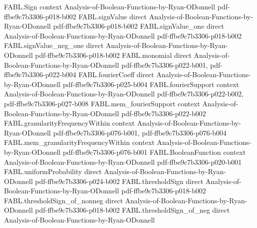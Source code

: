 \begin{theorem}
\label{FABL.booleanInfluence_eq_dimensionEdgeBoundaryFraction}
\leanok
{}
\proofstep
  {FABL.Sign}
  {context}
  {Analysis-of-Boolean-Functions-by-Ryan-ODonnell}
  {pdf-ffbe9c7b3306-p018-b002}
\proofstep
  {FABL.signValue}
  {direct}
  {Analysis-of-Boolean-Functions-by-Ryan-ODonnell}
  {pdf-ffbe9c7b3306-p018-b002}
\proofstep
  {FABL.signValue_one}
  {direct}
  {Analysis-of-Boolean-Functions-by-Ryan-ODonnell}
  {pdf-ffbe9c7b3306-p018-b002}
\proofstep
  {FABL.signValue_neg_one}
  {direct}
  {Analysis-of-Boolean-Functions-by-Ryan-ODonnell}
  {pdf-ffbe9c7b3306-p018-b002}
\proofstep
  {FABL.monomial}
  {direct}
  {Analysis-of-Boolean-Functions-by-Ryan-ODonnell}
  {pdf-ffbe9c7b3306-p022-b001,
    pdf-ffbe9c7b3306-p022-b004}
\proofstep
  {FABL.fourierCoeff}
  {direct}
  {Analysis-of-Boolean-Functions-by-Ryan-ODonnell}
  {pdf-ffbe9c7b3306-p025-b004}
\proofstep
  {FABL.fourierSupport}
  {context}
  {Analysis-of-Boolean-Functions-by-Ryan-ODonnell}
  {pdf-ffbe9c7b3306-p022-b002,
    pdf-ffbe9c7b3306-p027-b008}
\proofstep
  {FABL.mem_fourierSupport}
  {context}
  {Analysis-of-Boolean-Functions-by-Ryan-ODonnell}
  {pdf-ffbe9c7b3306-p022-b002}
\proofstep
  {FABL.granularityFrequencyWithin}
  {context}
  {Analysis-of-Boolean-Functions-by-Ryan-ODonnell}
  {pdf-ffbe9c7b3306-p076-b001,
    pdf-ffbe9c7b3306-p076-b004}
\proofstep
  {FABL.mem_granularityFrequencyWithin}
  {context}
  {Analysis-of-Boolean-Functions-by-Ryan-ODonnell}
  {pdf-ffbe9c7b3306-p076-b001}
\proofstep
  {FABL.BooleanFunction}
  {context}
  {Analysis-of-Boolean-Functions-by-Ryan-ODonnell}
  {pdf-ffbe9c7b3306-p020-b001}
\proofstep
  {FABL.uniformProbability}
  {direct}
  {Analysis-of-Boolean-Functions-by-Ryan-ODonnell}
  {pdf-ffbe9c7b3306-p024-b002}
\proofstep
  {FABL.thresholdSign}
  {direct}
  {Analysis-of-Boolean-Functions-by-Ryan-ODonnell}
  {pdf-ffbe9c7b3306-p018-b002}
\proofstep
  {FABL.thresholdSign_of_nonneg}
  {direct}
  {Analysis-of-Boolean-Functions-by-Ryan-ODonnell}
  {pdf-ffbe9c7b3306-p018-b002}
\proofstep
  {FABL.thresholdSign_of_neg}
  {direct}
  {Analysis-of-Boolean-Functions-by-Ryan-ODonnell}

\end{theorem}

